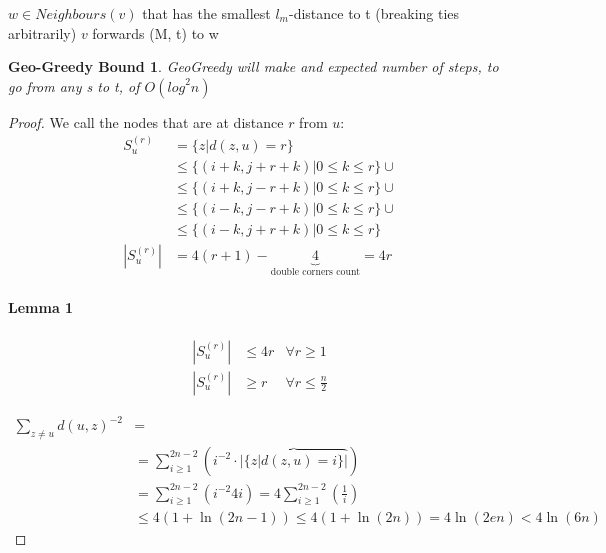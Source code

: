 \documentclass[]{article}
\begin{document}
\begin{algorithm}[H]
	\caption{Geo-Greedy(node: v, node: t, message: M) }
	\label{alg:geo-greedy}
	\begin{algorithmic}
			\STATE $w\in Neighbours(v)$ that has the smallest $l_m$-distance to t (breaking ties arbitrarily)
			\STATE $v$ forwards (M, t) to w
		\ENDIF
	\end{algorithmic}
\end{algorithm}

\newtheorem{GeoGreedy}{Geo-Greedy Bound}
\begin{GeoGreedy}
	GeoGreedy will make and expected number of steps, to go from any s to t, of $O({log}^2n)$
\end{GeoGreedy}

\begin{proof}
		We call the nodes that are at distance $r$ from $u$:
	\begin{align*}
	S^{(r)}_u &= \{z | d(z,u) = r\}\\
	&\leq \{(i+k, j+r+k) | 0\leq k \leq r \} \cup\\ 
	&\leq \{(i+k, j-r+k) | 0\leq k \leq r \} \cup\\ 
	&\leq \{(i-k, j-r+k) | 0\leq k \leq r \} \cup\\ 
	&\leq \{(i-k, j+r+k) | 0\leq k \leq r \}\\ 
	|S^{(r)}_u| &= 4(r+1) - \underbrace{4}_{\text{double corners count}} = 4r
	\end{align*}
	
	\paragraph{Lemma 1} 
	\begin{align*}
	|S^{(r)}_u| &\leq 4r &\forall r \geq 1\\
	|S^{(r)}_u| &\geq r  &\forall r \leq \frac{n}{2}
	\end{align*}
	
	\begin{align*}
		\sum_{z\neq u}^{}d(u,z)^{-2} &=\\
		&= \sum_{i\geq 1}^{2n-2}\left( i^{-2} \cdot \overbrace{ | \{z | d(z, u) = i\}| }  \right)\\
		&= \sum_{i\geq 1}^{2n-2}\left( i^{-2} 4i \right) = 4\sum_{i\geq 1}^{2n-2}\left( \frac{1}{i}  \right)\\
		&\leq 4(1+\ln(2n-1)) \leq 4(1+\ln(2n)) = 4\ln(2en) < 4\ln(6n)
	\end{align*}
	

\end{proof}
\end{document}
